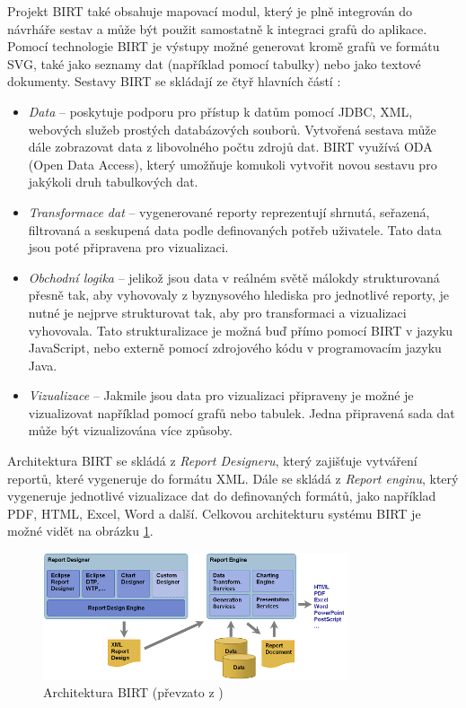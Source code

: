 \documentclass[czech,master,public,dept460,male,cpdeclaration,oneside]{diploma}
\begin{document}
Projekt BIRT také obsahuje mapovací modul, který je plně integrován do návrháře sestav a může být použit samostatně k integraci grafů do aplikace. Pomocí technologie BIRT je výstupy možné generovat kromě grafů ve formátu SVG, také jako seznamy dat (například pomocí tabulky) nebo jako textové dokumenty. Sestavy BIRT se skládají ze čtyř hlavních částí \cite{ref:birt_about}: 

\begin{itemize}
\item \textit{Data} -- poskytuje podporu pro přístup k datům pomocí JDBC, XML, webových služeb prostých databázových souborů. Vytvořená sestava může dále zobrazovat data z libovolného počtu zdrojů dat. BIRT využívá ODA (Open Data Access), který umožňuje komukoli vytvořit novou sestavu pro jakýkoli druh tabulkových dat.
\item \textit{Transformace dat} -- vygenerované reporty reprezentují shrnutá, seřazená, filtrovaná a seskupená data podle definovaných potřeb uživatele. Tato data jsou poté připravena pro vizualizaci.
\item \textit{Obchodní logika} -- jelikož jsou data v reálném světě málokdy strukturovaná přesně tak, aby vyhovovaly z byznysového hlediska pro jednotlivé reporty, je nutné je nejprve strukturovat tak, aby pro transformaci a vizualizaci vyhovovala. Tato strukturalizace je možná buď přímo pomocí BIRT v jazyku JavaScript, nebo externě pomocí zdrojového kódu v programovacím jazyku Java.

\item \textit{Vizualizace} -- Jakmile jsou data pro vizualizaci připraveny je možné je vizualizovat například pomocí grafů nebo tabulek. Jedna připravená sada dat může být vizualizována více způsoby.
\end{itemize}

Architektura BIRT se skládá z \textit{Report Designeru}, který zajišťuje vytváření reportů, které vygeneruje do formátu XML. Dále se skládá z \textit{Report enginu}, který vygeneruje jednotlivé vizualizace dat do definovaných formátů, jako například PDF, HTML, Excel, Word a další. Celkovou architekturu systému BIRT je možné vidět na obrázku \ref{fig:birtarch}.

\begin{figure}[!ht]
    \centering
    \includegraphics[width=0.8\textwidth]{Diplomka/Figures/birtarch.png}
    \caption{Architektura BIRT (převzato z \cite{ref:birt_about})}
    \label{fig:birtarch}
\end{figure}
\end{document}
